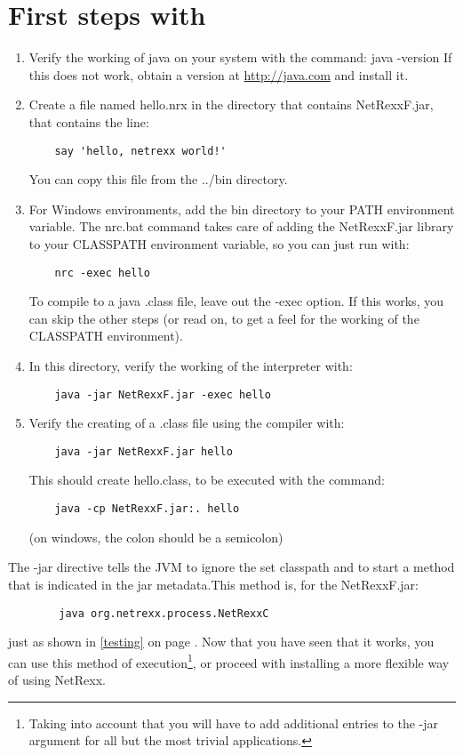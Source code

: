 \section{First steps with \nr{}}
\begin{enumerate}
\item Verify the working of java on your system with the command:
	java -version\newline
If this does not work, obtain a version at \url{http://java.com} and install it.

\item Create a file named hello.nrx in the directory that contains
  NetRexxF.jar, that contains  the line:
\begin{lstlisting}
	say 'hello, netrexx world!'
\end{lstlisting}
You can copy this file from the ../bin directory.
\item For Windows environments, add the bin directory to your PATH
  environment variable. The nrc.bat command takes care of adding the
  NetRexxF.jar library to your CLASSPATH environment variable,  so you
  can just run with:
\begin{lstlisting}
	nrc -exec hello
\end{lstlisting}
To compile to a java .class file, leave out the -exec option. If this
works, you can skip the other steps (or read on, to get a feel for the
working of the CLASSPATH environment).
\item In this directory, verify the working of the interpreter with:
\begin{lstlisting}
	java -jar NetRexxF.jar -exec hello
\end{lstlisting}
\item Verify the creating of a .class file using the compiler with:
\begin{lstlisting}
	java -jar NetRexxF.jar hello
\end{lstlisting}
This should create hello.class, to be executed with the command:
\begin{lstlisting}
	java -cp NetRexxF.jar:. hello
\end{lstlisting}
(on windows, the colon should be a semicolon)
\end{enumerate}
The -jar directive tells the JVM to ignore the set classpath and to
start a method that is indicated in the jar metadata.This method is,
for the NetRexxF.jar: 
 \begin{lstlisting}
        java org.netrexx.process.NetRexxC
\end{lstlisting}
just as shown in \ref{testing} on page \pageref{testing}. Now that you
have seen that it works, you can use this method of
execution\footnote{Taking into account that you will have to add
  additional entries to the -jar argument for all but the most trivial
applications.}, or
proceed with installing a more flexible way of using NetRexx.

